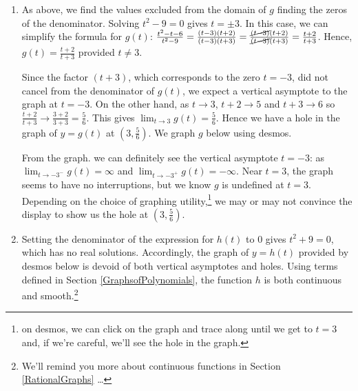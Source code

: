 \documentclass{ximera}
\begin{document}
\begin{example}
\begin{explanation}
\begin{enumerate}
From the graph, we see  $\lim_{x \rightarrow -\sqrt{3}^{\, -}} f(x) = -\infty$, $\lim_{x \rightarrow -\sqrt{3}^{\, +}} f(x) = \infty$, $\lim_{x \rightarrow \sqrt{3}^{\, -}} f(x) = -\infty$, and $\lim_{x \rightarrow \sqrt{3}^{\, +}} f(x) = \infty$.

As a side note, the graph of $f$ appears to be symmetric about the origin.  Sure enough, we find: $f(-x) = \frac{2(-x)}{(-x)^2-3} = -\frac{2x}{x^2-3} = -f(x)$, proving $f$ is odd.


\item  As above, we find the values excluded from the domain of $g$ finding the zeros of the denominator.  Solving $t^2 - 9 = 0$ gives $t = \pm 3$.  In this case, we can simplify the formula for $g(t)$:  $\frac{t^2-t-6}{t^2-9} = \frac{(t-3)(t+2)}{(t-3)(t+3)} =\frac{\cancel{(t-3)}(t+2)}{\cancel{(t-3)}(t+3)} =  \frac{t+2}{t+3}$.   Hence, $g(t) = \frac{t+2}{t+3}$ provided $t \neq 3$.  

Since the factor $(t+3)$, which corresponds to the zero $t = -3$, did not cancel from the denominator of $g(t)$, we expect a vertical asymptote to the graph at $t = -3$.  On the other hand, as $t \rightarrow 3$, $t+2 \rightarrow 5$ and $t+3 \rightarrow 6$ so $\frac{t+2}{t+3} \rightarrow \frac{3+2}{3+3} = \frac{5}{6}$.  This gives $\lim_{t \rightarrow 3} g(t) = \frac{5}{6}$.   Hence we have a hole in the graph of $y = g(t)$ at  $\left(3, \frac{5}{6}\right)$.  We graph $g$ below using desmos.

\begin{center}
\end{center} 


 From the graph.  we can definitely see the vertical asymptote $t=-3$:  as  $\lim_{t \rightarrow -3^{-}} g(t) = \infty$ and $\lim_{t \rightarrow -3^{+}} g(t) = -\infty$.  Near $t=3$, the graph seems to have no interruptions, but we know $g$ is undefined at $t=3$.  Depending on the choice of graphing utility,\footnote{on desmos, we can click on the graph and trace along until we get to $t=3$ and, if we're careful, we'll see the hole in the graph.} we may or may not convince the display to show us the hole at $\left(3, \frac{5}{6}\right)$.

\item  Setting the denominator of the expression for $h(t)$ to $0$ gives $t^2+9 = 0$, which has no real solutions.  Accordingly, the graph of $y=h(t)$ provided by desmos below is devoid of both vertical asymptotes and holes.  Using terms defined in Section \ref{GraphsofPolynomials},  the function $h$ is both continuous and smooth.\footnote{We'll remind you more about continuous functions in Section \ref{RationalGraphs}  \ldots}


\end{enumerate}
\end{explanation}
\end{example}
\end{document}
